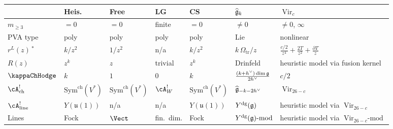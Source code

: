 \begin{center}
\renewcommand{\arraystretch}{1.25}
{\small
\begin{tabular}{p{}p{}p{}p{}p{}p{}p{}}
& \textbf{Heis.} & \textbf{Free} &
 \textbf{LG} & \textbf{CS} &
 \textbf{$\widehat{\mathfrak{g}}_k$} &
 \textbf{$\operatorname{Vir}_c$} \\
\hline
$m_{\geq 3}$ & $= 0$ & $= 0$ & finite & $= 0$ &
 $\neq 0$ & $\neq 0$, $\infty$ \\
PVA type & poly & poly & poly & poly &
 Lie & nonlinear \\
$r^L(z)$\,$^*$ & $k/z^2$ & $1/z^2$ & n/a & $k/z^2$ &
 $k\,\Omega_{\mathrm{tr}}/z$ &
 $\frac{c/2}{z^4} + \frac{2T}{z^2} + \frac{\partial T}{z}$ \\
$R(z)$ & $z^k$ & $z$ & trivial & $z^k$ &
 Drinfeld & heuristic model via fusion kernel \\
$\kappaChHodge$ & $k$ & $1$ & $0$ & $k$ &
 $\frac{(k{+}h^\vee)\dim\mathfrak{g}}{2h^\vee}$ & $c/2$ \\
$\cA^!_{\mathrm{ch}}$ & $\mathrm{Sym}^{\mathrm{ch}}(V^*)$ & $\mathrm{Sym}^{\mathrm{ch}}(V^*)$ & $\cA^!_W$ &
 $\mathrm{Sym}^{\mathrm{ch}}(V^*)$ &
 $\widehat{\mathfrak{g}}_{-k-2h^\vee}$ &
 $\operatorname{Vir}_{26 - c}$ \\
$\cA^!_{\mathrm{line}}$ & $Y(\mathfrak{u}(1))$ & n/a & n/a &
 $Y(\mathfrak{u}(1))$ &
 $Y^{\mathrm{dg}}(\mathfrak{g})$ &
 heuristic model via $\operatorname{Vir}_{26 - c}$ \\
Lines & Fock & $\Vect$ & fin.\ dim. &
 Fock &
 $Y^{\mathrm{dg}}(\mathfrak{g})\text{-mod}$ &
 heuristic model via $\operatorname{Vir}_{26 - c}\text{-mod}$
\end{tabular}
}
\end{center}
\smallskip

